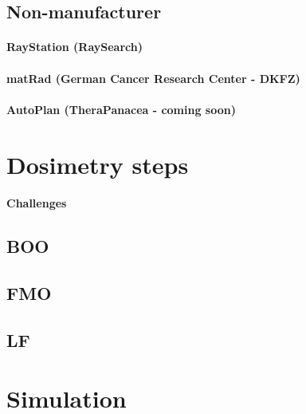 \subsection{Non-manufacturer}
\paragraph{RayStation (RaySearch)}
\paragraph{matRad (German Cancer Research Center - DKFZ)}
\paragraph{AutoPlan (TheraPanacea - coming soon)}

\section{Dosimetry steps}
\paragraph{Challenges}
\subsection{BOO}
\subsection{FMO}
\subsection{LF}

\section{Simulation}

